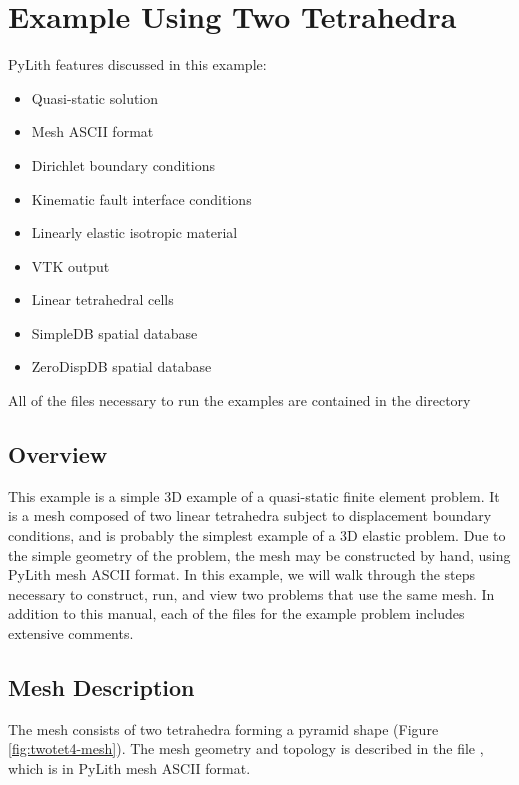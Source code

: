\section{Example Using Two Tetrahedra}
\label{sec:example:twotet4}

PyLith features discussed in this example:
\begin{itemize}
\item Quasi-static solution
\item Mesh ASCII format
\item Dirichlet boundary conditions
\item Kinematic fault interface conditions
\item Linearly elastic isotropic material
\item VTK output
\item Linear tetrahedral cells
\item SimpleDB spatial database
\item ZeroDispDB spatial database
\end{itemize}
All of the files necessary to run the examples are contained in the
directory 


\subsection{Overview}

This example is a simple 3D example of a quasi-static finite element
problem. It is a mesh composed of two linear tetrahedra subject to
displacement boundary conditions, and is probably the simplest example
of a 3D elastic problem. Due to the simple geometry of the problem,
the mesh may be constructed by hand, using PyLith mesh ASCII format.
In this example, we will walk through the steps necessary to
construct, run, and view two problems that use the same mesh. In
addition to this manual, each of the files for the example problem
includes extensive comments.


\subsection{Mesh Description}

The mesh consists of two tetrahedra forming a pyramid shape (Figure
\vref{fig:twotet4-mesh}). The mesh geometry and topology is described
in the file , which is in PyLith mesh ASCII
format.

